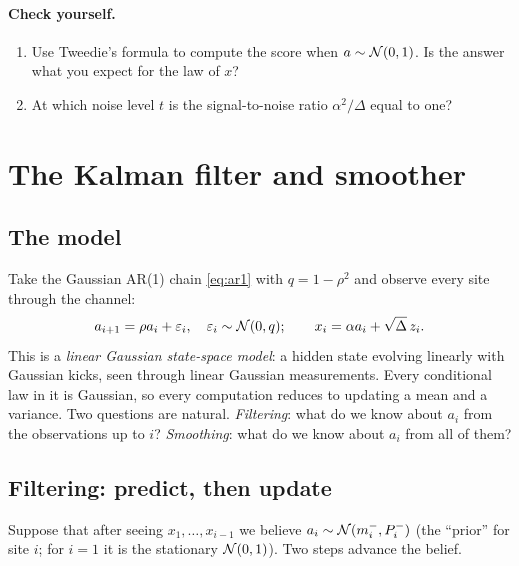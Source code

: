 \paragraph{Check yourself.}
\begin{enumerate}[label=\thesection.\arabic*,leftmargin=2.2em]
\item Use Tweedie's formula to compute the score when $a\sim\mathcal{N}(0,1)$. Is the answer what you expect for the law of $x$?
\item At which noise level $t$ is the signal-to-noise ratio $\alpha^2/\Delta$ equal to one?
\end{enumerate}

\section{The Kalman filter and smoother}\label{sec:kalman}

\subsection{The model}

Take the Gaussian AR(1) chain \eqref{eq:ar1} with $q=1-\rho^2$ and observe every site through the channel:
\begin{equation}\label{eq:ssm}
  a_{i+1}=\rho a_i+\varepsilon_i,\quad\varepsilon_i\sim\mathcal{N}(0,q);\qquad x_i=\alpha a_i+\sqrt\Delta\,z_i .
\end{equation}
This is a \emph{linear Gaussian state-space model}: a hidden state evolving linearly with Gaussian kicks, seen
through linear Gaussian measurements. Every conditional law in it is Gaussian, so every computation reduces
to updating a mean and a variance. Two questions are natural. \emph{Filtering}: what do we know about $a_i$
from the observations up to $i$? \emph{Smoothing}: what do we know about $a_i$ from all of them?

\subsection{Filtering: predict, then update}

Suppose that after seeing $x_1,\dots,x_{i-1}$ we believe $a_i\sim\mathcal{N}(m_i^-,P_i^-)$ (the ``prior'' for site $i$;
for $i=1$ it is the stationary $\mathcal{N}(0,1)$). Two steps advance the belief.


